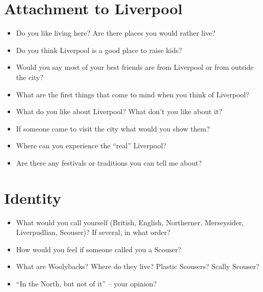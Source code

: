	\section*{Attachment to Liverpool}
	\begin{multicols}{2}
		\begin{itemize}
			\item Do you like living here? Are there places you would rather live?
			\item Do you think Liverpool is a good place to raise kids?
			\item Would you say most of your best friends are from Liverpool or from outside the city?
			\item What are the first things that come to mind when you think of Liverpool?
			\item What do you like about Liverpool? What don't you like about it?
			\item If someone came to visit the city what would you show them?
			\item Where can you experience the \enquote{real} Liverpool?
			\item Are there any festivals or traditions you can tell me about?
		\end{itemize}
	\end{multicols}
	
	\section*{Identity}
	\begin{multicols}{2}
		\begin{itemize}
			\item What would you call yourself (British, English, Northerner, Merseysider, Liverpudlian, Scouser)? If several, in what order?
			\item How would you feel if someone called you a Scouser?
			\item What are Woolybacks? Where do they live? Plastic Scousers? Scally Scouser?
			\item ``In the North, but not of it'' -- your opinion?
		\end{itemize}
	\end{multicols}
	
